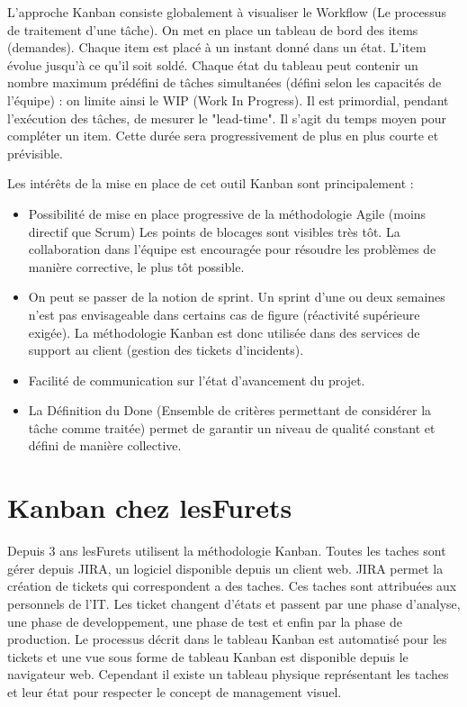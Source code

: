 L'approche Kanban consiste globalement à visualiser le Workflow (Le processus de traitement d'une tâche). On met en place un tableau de bord des items (demandes). Chaque item est placé à un instant donné dans un état. L'item évolue jusqu'à ce qu'il soit soldé. Chaque état du tableau peut contenir un nombre maximum prédéfini de tâches simultanées (défini selon les capacités de l'équipe) : on limite ainsi le WIP (Work In Progress). Il est primordial, pendant l'exécution des tâches, de mesurer le "lead-time". Il s'agit du temps moyen pour compléter un item. Cette durée sera progressivement de plus en plus courte et prévisible.

Les intérêts de la mise en place de cet outil Kanban sont principalement :
\begin{itemize}
\item 
Possibilité de mise en place progressive de la méthodologie Agile (moins directif que Scrum)
Les points de blocages sont visibles très tôt. La collaboration dans l'équipe est encouragée pour résoudre les problèmes de manière corrective, le plus tôt possible.
\item
On peut se passer de la notion de sprint. Un sprint d'une ou deux semaines n'est pas envisageable dans certains cas de figure (réactivité supérieure exigée). La méthodologie Kanban est donc utilisée dans des services de support au client (gestion des tickets d'incidents).
\item
Facilité de communication sur l'état d'avancement du projet.
\item 
La Définition du Done (Ensemble de critères permettant de considérer la tâche comme traitée) permet de garantir un niveau de qualité constant et défini de manière collective.
\end{itemize}

\section{Kanban chez lesFurets}
Depuis 3 ans lesFurets utilisent la méthodologie Kanban.
Toutes les taches sont gérer depuis JIRA, un logiciel disponible depuis un client web. JIRA permet la création de tickets qui correspondent a des taches. Ces taches sont attribuées aux personnels de l'IT. Les ticket changent d'états et passent par une phase d'analyse, une phase de developpement, une phase de test et enfin par la phase de production. Le processus décrit dans le tableau Kanban est automatisé pour les tickets et une vue sous forme de tableau Kanban est disponible depuis le navigateur web. Cependant il existe un tableau physique représentant les taches et leur état pour respecter le concept de management visuel.

